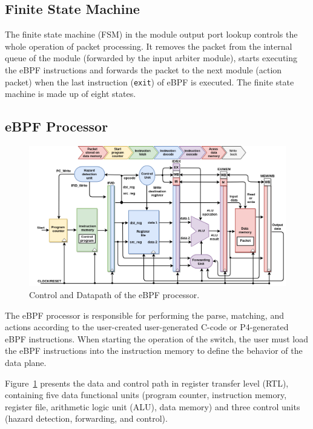 \subsection{Finite State Machine}

The finite state machine (FSM) in the module output port lookup controls the whole operation of packet processing. It removes the packet from the internal queue of the module (forwarded by the input arbiter module), starts executing the eBPF instructions and forwards the packet to the next module (action packet) when the last instruction (\texttt{exit}) of eBPF is executed. The finite state machine is made up of eight states.

\subsection{eBPF Processor}

\begin{figure}[hbt]
\centering
\includegraphics[width=.9\textwidth]{figures/06_fig02.png}
\caption{Control and Datapath of the eBPF processor.}
\label{fig:06_fig02}
\end{figure}


The eBPF processor is responsible for performing the parse, matching, and actions according to the user-created user-generated C-code or P4-generated eBPF instructions. When starting the operation of the switch, the user must load the eBPF instructions into the instruction memory to define  the behavior of the data plane.

Figure~\ref{fig:06_fig02} presents the data and control path in register transfer level (RTL), containing five data functional units (program counter, instruction memory, register file, arithmetic logic unit (ALU), data memory) and three control units (hazard detection, forwarding, and control).

